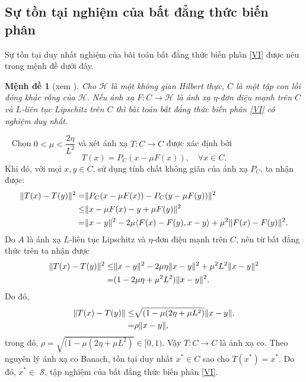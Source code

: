 \documentclass[14pt, oneside,A4paper]{book}
\theoremstyle{plain}
\newcommand{\chm}{{\bf  Chứng minh.}}
\newtheorem{md}[theorem]{Mệnh đề}
\begin{document}

\subsection{Sự tồn tại nghiệm của bất đẳng thức biến phân}
  Sự tồn tại duy nhất nghiệm của bài toán bất đẳng thức biến phân \eqref{VI} được nêu trong mệnh đề dưới đây.

\begin{md}[xem \cite{Kon}]  Cho $ \mathcal H$ là một không gian Hilbert thực, $C$ là một tập con lồi đóng khác rỗng của $ \mathcal H$. Nếu ánh xạ  $F: C \to {\mathcal H}$ là ánh xạ $ \eta$-đơn điệu mạnh trên $C$ và $L$-liên tục Lipschitz trên $C$ thì bài toán bất đẳng thức biến phân \eqref{VI} có nghiệm duy nhất.
\end{md}

\noindent \chm \rm \ 
	Chọn $0 < \mu < \dfrac{2\eta}{L^2}$ và xét ánh xạ $T: C \to C$ được xác định bởi 
	$$T(x) = P_C(x- \mu F(x)), \quad \forall x \in C.$$
	Khi đó, với mọi $x,y \in C$, sử dụng tính chất không giãn của ánh xạ $P_C$, ta nhận được:
	\begin{alignat*}{2}
	\| T(x)-T(y) \|^2 =& \| P_C(x- \mu F(x)) - P_C(y- \mu F(y))\|^2 \notag\\
	\leq & \| x - \mu F(x) - y + \mu F(y) \|^2 \notag\\
	= & \| x - y \|^2 - 2 \mu \langle F(x) - F(y) , x - y \rangle + \mu ^2 \| F(x) - F(y)\|^2.
	\end{alignat*}
	Do $A$ là ánh xạ $L$-liên tục Lipschitz và $\eta$-đơn điệu mạnh trên $C$, nên từ bất đẳng thức trên ta nhận được
	\begin{alignat*}{2}
	\|T(x) - T(y) \|^2 \leq & \| x - y \|^2 - 2\mu \eta \| x - y\|^2 +\mu^2 L^2 \| x - y \|^2 \notag\\
	= & (1 - 2 \mu \eta + \mu^2  L^2) \| x- y \|^2.
	\end{alignat*}
	Do đó, 
	\begin{alignat*}{2}
	\| T(x) - T(y) \| \leq & \sqrt{(1 - \mu (2 \eta + \mu L^2)} \| x- y \|.\notag\\
	= & \rho \| x- y \|, 
	\end{alignat*}
	trong đó, $\rho =  \sqrt{(1 - \mu (2 \eta + \mu L^2)} \in [0, 1).$ Vậy $T: C \to C$ là ánh xạ co. Theo nguyên lý ánh xạ co Banach, tồn tại duy nhất $x^* \in C$ sao cho $T(x^*) = x^*$. Do đó, $x^* \in$ $\mathcal S$, tập nghiệm của bất đẳng thức biến phân \eqref{VI}.
\end{document}
